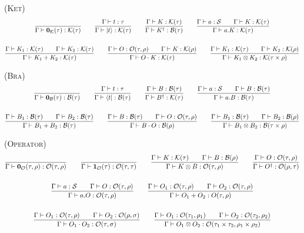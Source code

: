 \textsc{(Ket)}
\begin{gather*}
  \frac{}{\Gamma \vdash \mathbf{0}_{\mathcal{K}}(\tau) : \mathcal{K}(\tau)}
  \qquad
  \frac{\Gamma \vdash t : \tau}{\Gamma \vdash \ket{t} : \mathcal{K}(\tau)}
  \qquad
  \frac{\Gamma \vdash K : \mathcal{K}(\tau)}{\Gamma \vdash K^\dagger : \mathcal{B}(\tau)}
  \qquad
  \frac{\Gamma \vdash a : \mathcal{S} \qquad \Gamma \vdash K : \mathcal{K}(\tau)}{\Gamma \vdash a . K : \mathcal{K}(\tau)} \\
  \\
  \frac{\Gamma \vdash K_1 : \mathcal{K}(\tau) \qquad \Gamma \vdash K_2 : \mathcal{K}(\tau) }{\Gamma \vdash K_1 + K_2 : \mathcal{K}(\tau) }
  \qquad
  \frac{\Gamma \vdash O : \mathcal{O}(\tau, \rho) \qquad \Gamma \vdash K : \mathcal{K}(\rho) }{\Gamma \vdash O \cdot K : \mathcal{K}(\tau) }
  \qquad
  \frac{\Gamma \vdash K_1 : \mathcal{K}(\tau) \qquad \Gamma \vdash K_2 : \mathcal{K}(\rho) }{\Gamma \vdash K_1 \otimes K_2 : \mathcal{K}(\tau \times \rho)}
\end{gather*}

\textsc{(Bra)}
\begin{gather*}
  \frac{}{\Gamma \vdash \mathbf{0}_{\mathcal{B}}(\tau) : \mathcal{B}(\tau)}
  \qquad
  \frac{\Gamma \vdash t : \tau}{\Gamma \vdash \bra{t} : \mathcal{B}(\tau)}
  \qquad
  \frac{\Gamma \vdash B : \mathcal{B}(\tau)}{\Gamma \vdash B^\dagger : \mathcal{K}(\tau)}
  \qquad
  \frac{\Gamma \vdash a : \mathcal{S} \qquad \Gamma \vdash B : \mathcal{B}(\tau)}{\Gamma \vdash a . B : \mathcal{B}(\tau)} \\
  \\
  \frac{\Gamma \vdash B_1 : \mathcal{B}(\tau) \qquad \Gamma \vdash B_2 : \mathcal{B}(\tau) }{\Gamma \vdash B_1 + B_2 : \mathcal{B}(\tau) }
  \qquad
  \frac{\Gamma \vdash B : \mathcal{B}(\tau) \qquad \Gamma \vdash O : \mathcal{O}(\tau, \rho) }{\Gamma \vdash B \cdot O : \mathcal{B}(\rho) } 
  \qquad
  \frac{\Gamma \vdash B_1 : \mathcal{B}(\tau) \qquad \Gamma \vdash B_2 : \mathcal{B}(\rho) }{\Gamma \vdash B_1 \otimes B_2 : \mathcal{B}(\tau \times \rho)}
\end{gather*}

\textsc{(Operator)}
\begin{gather*}
  \frac{}{\Gamma \vdash \mathbf{0}_{\mathcal{O}}(\tau, \rho) : \mathcal{O}(\tau, \rho)}
  \qquad
  \frac{}{\Gamma \vdash \mathbf{1}_{\mathcal{O}}(\tau) : \mathcal{O}(\tau, \tau)}
  \qquad
  \frac{\Gamma \vdash K : \mathcal{K}(\tau) \qquad \Gamma \vdash B : \mathcal{B}(\rho) }{\Gamma \vdash K \otimes B : \mathcal{O}(\tau, \rho)}
  \qquad
  \frac{\Gamma \vdash O : \mathcal{O}(\tau, \rho)}{\Gamma \vdash O^\dagger : \mathcal{O}(\rho, \tau)} \\
  \\
  \frac{\Gamma \vdash a : \mathcal{S} \qquad \Gamma \vdash O : \mathcal{O}(\tau, \rho)}{\Gamma \vdash a . O : \mathcal{O}(\tau, \rho)}
  \qquad
  \frac{\Gamma \vdash O_1 : \mathcal{O}(\tau, \rho) \qquad \Gamma \vdash O_2 : \mathcal{O}(\tau, \rho) }{\Gamma \vdash O_1 + O_2 : O(\tau, \rho) } \\
  \\
  \frac{\Gamma \vdash O_1 : \mathcal{O}(\tau, \rho) \qquad \Gamma \vdash O_2 : \mathcal{O}(\rho, \sigma) }{\Gamma \vdash O_1 \cdot O_2 : \mathcal{O}(\tau, \sigma) }
  \qquad
  \frac{\Gamma \vdash O_1 : \mathcal{O}(\tau_1, \rho_1) \qquad \Gamma \vdash O_2 : \mathcal{O}(\tau_2, \rho_2) }{\Gamma \vdash O_1 \otimes O_2 : \mathcal{O}(\tau_1 \times \tau_2, \rho_1 \times \rho_2)}
\end{gather*}


